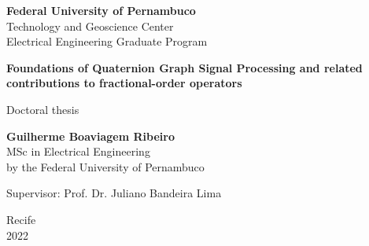 \begin{center}
    \begin{spacing}{1.3}
        \textbf{\Large Federal University of Pernambuco}\\
        {\large Technology and Geoscience Center}\\
        {\large Electrical Engineering Graduate Program}\\
    \end{spacing}
\end{center}

\vspace{23mm}

\begin{center}
    \begin{spacing}{1.6}
        \textbf{\LARGE Foundations of Quaternion Graph Signal Processing and related contributions to fractional-order operators}
    \end{spacing}
\end{center}

\vspace{10 mm}

\begin{center}
    {\Large Doctoral thesis}
\end{center}

\vspace{10 mm}

\begin{center}
    \begin{spacing}{1.7}
        \textbf{\Large Guilherme Boaviagem Ribeiro}\\
        {\large MSc in Electrical Engineering}\\
        {\large by the Federal University of Pernambuco}\\
    \end{spacing}
\end{center}

\vspace{15 mm}

\begin{center}
    \begin{spacing}{1.5}
        {\Large Supervisor: Prof. Dr. Juliano Bandeira Lima}\\
    \end{spacing}
\end{center}

\vspace{10 mm}

\begin{center}
    \Large
    Recife \\
    2022
\end{center}